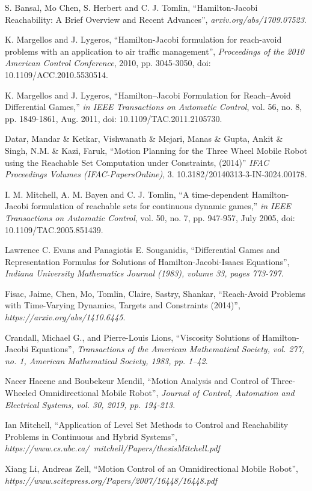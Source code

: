 \begin{thebibliography}{1}


S. Bansal, Mo Chen, S. Herbert and C. J. Tomlin, ``Hamilton-Jacobi Reachability: A Brief Overview and Recent Advances'',
\emph{arxiv.org/abs/1709.07523}.

K. Margellos and J. Lygeros, ``Hamilton-Jacobi formulation for reach-avoid problems with an application to air traffic management'',
\emph{Proceedings of the 2010 American Control Conference}, 2010, pp. 3045-3050, doi: 10.1109/ACC.2010.5530514.

K. Margellos and J. Lygeros, ``Hamilton–Jacobi Formulation for Reach–Avoid Differential Games,''
\emph{in IEEE Transactions on Automatic Control}, vol. 56, no. 8, pp. 1849-1861, Aug. 2011, doi: 10.1109/TAC.2011.2105730.

Datar, Mandar \& Ketkar, Vishwanath \& Mejari, Manas \& Gupta, Ankit \& Singh, N.M. \& Kazi, Faruk, ``Motion Planning for the Three Wheel Mobile Robot using the Reachable Set Computation under Constraints, (2014)''
\emph{IFAC Proceedings Volumes (IFAC-PapersOnline)}, 3. 10.3182/20140313-3-IN-3024.00178.

I. M. Mitchell, A. M. Bayen and C. J. Tomlin, ``A time-dependent Hamilton-Jacobi formulation of reachable sets for continuous dynamic games,''
\emph{in IEEE Transactions on Automatic Control}, vol. 50, no. 7, pp. 947-957, July 2005, doi: 10.1109/TAC.2005.851439.

Lawrence C. Evans and Panagiotis E. Souganidis, ``Differential Games and Representation Formulas for Solutions of Hamilton-Jacobi-Isaacs Equations'',
\emph{Indiana University Mathematics Journal (1983), volume 33, pages 773-797}.

Fisac, Jaime, Chen, Mo, Tomlin, Claire, Sastry, Shankar, ``Reach-Avoid Problems with Time-Varying Dynamics, Targets and Constraints (2014)'',
\emph{https://arxiv.org/abs/1410.6445}.

Crandall, Michael G., and Pierre-Louis Lions, ``Viscosity Solutions of Hamilton-Jacobi Equations'',
\emph{Transactions of the American Mathematical Society, vol. 277, no. 1, American Mathematical Society, 1983, pp. 1–42}.

Nacer Hacene and Boubekeur Mendil, ``Motion Analysis and Control of Three-Wheeled Omnidirectional Mobile Robot'',
\emph{Journal of Control, Automation and Electrical Systems, vol. 30, 2019, pp. 194-213}.

Ian Mitchell, ``Application of Level Set Methods to Control and Reachability Problems in Continuous and Hybrid Systems'',
\emph{https://www.cs.ubc.ca/~mitchell/Papers/thesisMitchell.pdf}

Xiang Li, Andreas Zell, ``Motion Control of an Omnidirectional Mobile Robot'',
\emph{https://www.scitepress.org/Papers/2007/16448/16448.pdf}

\end{thebibliography}
